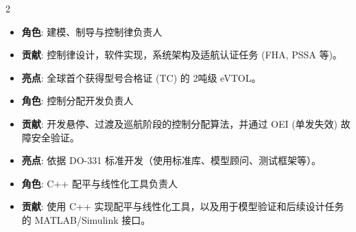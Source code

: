 \documentclass[10pt,a4paper,ragged2e,withhyper]{altacv}
\begin{document}
\begin{paracol}{2}
            \begin{itemize} \justifying
                \item \textbf{角色}: 建模、制导与控制律负责人
                \item \textbf{贡献}: 控制律设计，软件实现，系统架构及适航认证任务 (FHA, PSSA 等)。
                \item \textbf{亮点}: 全球首个获得型号合格证 (TC) 的 2吨级 eVTOL。
            \end{itemize}
            \bigskip
        
            \begin{itemize} \justifying
                \item \textbf{角色}: 控制分配开发负责人
                \item \textbf{贡献}: 开发悬停、过渡及巡航阶段的控制分配算法，并通过 OEI (单发失效) 故障安全验证。
                \item \textbf{亮点}: 依据 DO-331 标准开发（使用标准库、模型顾问、测试框架等）。
            \end{itemize}
            \bigskip
            
            \begin{itemize} \justifying
                \item \textbf{角色}: C++ 配平与线性化工具负责人
                \item \textbf{贡献}: 使用 C++ 实现配平与线性化工具，以及用于模型验证和后续设计任务的 MATLAB/Simulink 接口。
            \end{itemize}
            \bigskip


\end{paracol}
\end{document}
